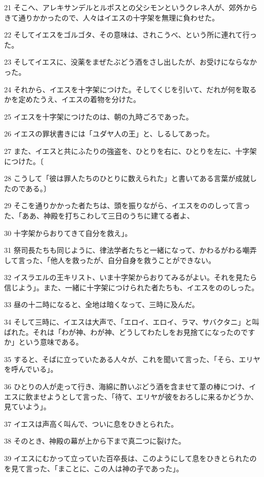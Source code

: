 \par 21 そこへ、アレキサンデルとルポスとの父シモンというクレネ人が、郊外からきて通りかかったので、人々はイエスの十字架を無理に負わせた。
\par 22 そしてイエスをゴルゴタ、その意味は、されこうべ、という所に連れて行った。
\par 23 そしてイエスに、没薬をまぜたぶどう酒をさし出したが、お受けにならなかった。
\par 24 それから、イエスを十字架につけた。そしてくじを引いて、だれが何を取るかを定めたうえ、イエスの着物を分けた。
\par 25 イエスを十字架につけたのは、朝の九時ごろであった。
\par 26 イエスの罪状書きには「ユダヤ人の王」と、しるしてあった。
\par 27 また、イエスと共にふたりの強盗を、ひとりを右に、ひとりを左に、十字架につけた。〔
\par 28 こうして「彼は罪人たちのひとりに数えられた」と書いてある言葉が成就したのである。〕
\par 29 そこを通りかかった者たちは、頭を振りながら、イエスをののしって言った、「ああ、神殿を打ちこわして三日のうちに建てる者よ、
\par 30 十字架からおりてきて自分を救え」。
\par 31 祭司長たちも同じように、律法学者たちと一緒になって、かわるがわる嘲弄して言った、「他人を救ったが、自分自身を救うことができない。
\par 32 イスラエルの王キリスト、いま十字架からおりてみるがよい。それを見たら信じよう」。また、一緒に十字架につけられた者たちも、イエスをののしった。
\par 33 昼の十二時になると、全地は暗くなって、三時に及んだ。
\par 34 そして三時に、イエスは大声で、「エロイ、エロイ、ラマ、サバクタニ」と叫ばれた。それは「わが神、わが神、どうしてわたしをお見捨てになったのですか」という意味である。
\par 35 すると、そばに立っていたある人々が、これを聞いて言った、「そら、エリヤを呼んでいる」。
\par 36 ひとりの人が走って行き、海綿に酢いぶどう酒を含ませて葦の棒につけ、イエスに飲ませようとして言った、「待て、エリヤが彼をおろしに来るかどうか、見ていよう」。
\par 37 イエスは声高く叫んで、ついに息をひきとられた。
\par 38 そのとき、神殿の幕が上から下まで真二つに裂けた。
\par 39 イエスにむかって立っていた百卒長は、このようにして息をひきとられたのを見て言った、「まことに、この人は神の子であった」。
